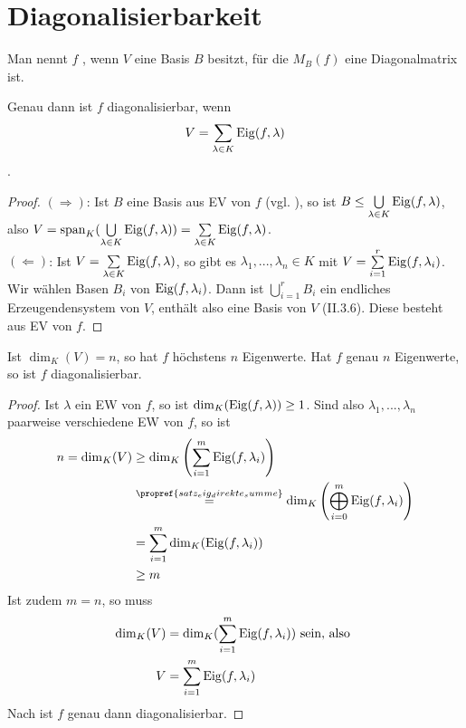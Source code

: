 \section{Diagonalisierbarkeit}

\begin{definition}[diagonalisierbar]
	Man nennt $f$ , wenn $V$ eine Basis $B$ besitzt, für die $M_B(f)$ eine Diagonalmatrix ist.
\end{definition}

\begin{lemma}
	Genau dann ist $f$ diagonalisierbar, wenn
	\begin{align}
		V=\sum\limits_{\lambda\in K} \operatorname{Eig}(f,\lambda) \notag
	\end{align}.
\end{lemma}
\begin{proof}
	$(\Rightarrow)$: Ist $B$ eine Basis aus EV von $f$ (vgl. ), so ist $B\le \bigcup\limits_{\lambda\in K}\operatorname{Eig}(f,\lambda)$, also $V=\operatorname{span}_K(\bigcup\limits_{\lambda\in K}\operatorname{Eig}(f, \lambda))=\sum\limits_{\lambda\in K}\operatorname{Eig}(f,\lambda)$. \\
	$(\Leftarrow)$: Ist $V=\sum\limits_{\lambda\in K}\operatorname{Eig}(f,\lambda)$, so gibt es $\lambda_1,...,\lambda_n \in K$ mit $V=\sum\limits_{i=1}^r \operatorname{Eig}(f,\lambda_i)$. Wir wählen Basen $B_i$ von $\operatorname{Eig}(f,\lambda_i)$. Dann ist $\bigcup\limits_{i=1}^r B_i$ ein endliches Erzeugendensystem von $V$, enthält also eine Basis von $V$ (II.3.6). Diese besteht aus EV von $f$. %
\end{proof}

\begin{proposition}
	Ist $\dim_K(V)=n$, so hat $f$ höchstens $n$ Eigenwerte. Hat $f$ genau $n$ Eigenwerte, so ist $f$ diagonalisierbar.
\end{proposition}
\begin{proof}
	Ist $\lambda$ ein EW von $f$, so ist $\dim_K(\operatorname{Eig}(f,\lambda))\ge 1$. Sind also $\lambda_1,...,\lambda_n$ paarweise verschiedene EW von $f$, so ist
	\begin{align}
		n=\dim_K(V)&\ge \dim_K\left( \sum\limits_{i=1}^m \Eig(f,\lambda_i)\right) \notag \\
		&\overset{\propref{satz_eig_direkte_summe}}{=} \dim_K\left( \bigoplus_{i=0}^{m} \Eig(f,\lambda_i)\right) \notag \\
		&= \sum\limits_{i=1}^m \dim_K(\Eig(f,\lambda_i)) \notag \\
		&\ge m \notag
	\end{align}
	Ist zudem $m=n$, so muss 
	\begin{align}
		\dim_K(V) &= \dim_K(\sum\limits_{i=1}^m \operatorname{Eig}(f,\lambda_i))\text{ sein, also }\notag \\
		V&= \sum\limits_{i=1}^m \operatorname{Eig}(f,\lambda_i) \notag
	\end{align}
	Nach  ist $f$ genau dann diagonalisierbar.
\end{proof}

